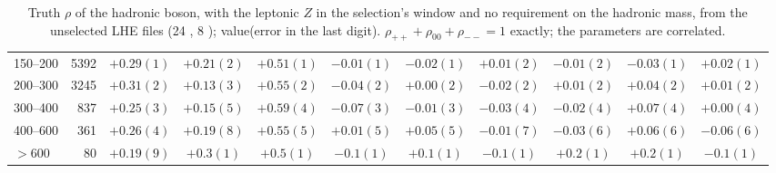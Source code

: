 \begin{table}[htbp]
\begin{tabular}{lrccccccccc}
150--200 & 5392 & $+0.29(1)$ & $+0.21(2)$ & $+0.51(1)$ & $-0.01(1)$ & $-0.02(1)$ & $+0.01(2)$ & $-0.01(2)$ & $-0.03(1)$ & $+0.02(1)$ \\
200--300 & 3245 & $+0.31(2)$ & $+0.13(3)$ & $+0.55(2)$ & $-0.04(2)$ & $+0.00(2)$ & $-0.02(2)$ & $+0.01(2)$ & $+0.04(2)$ & $+0.01(2)$ \\
300--400 & 837 & $+0.25(3)$ & $+0.15(5)$ & $+0.59(4)$ & $-0.07(3)$ & $-0.01(3)$ & $-0.03(4)$ & $-0.02(4)$ & $+0.07(4)$ & $+0.00(4)$ \\
400--600 & 361 & $+0.26(4)$ & $+0.19(8)$ & $+0.55(5)$ & $+0.01(5)$ & $+0.05(5)$ & $-0.01(7)$ & $-0.03(6)$ & $+0.06(6)$ & $-0.06(6)$ \\
$> 600$ & 80 & $+0.19(9)$ & $+0.3(1)$ & $+0.5(1)$ & $-0.1(1)$ & $+0.1(1)$ & $-0.1(1)$ & $+0.2(1)$ & $+0.2(1)$ & $-0.1(1)$ \\
\bottomrule
\end{tabular}
\caption{Truth $\rho$ of the hadronic boson, with the leptonic $Z$ in the selection's window and no requirement on the
hadronic mass, from the unselected LHE files (24 , 8 ); value(error in the last digit).
$\rho_{++}+\rho_{00}+\rho_{--} = 1$ exactly; the parameters are correlated.}
\label{tab:app:truthHad}
\end{table}

